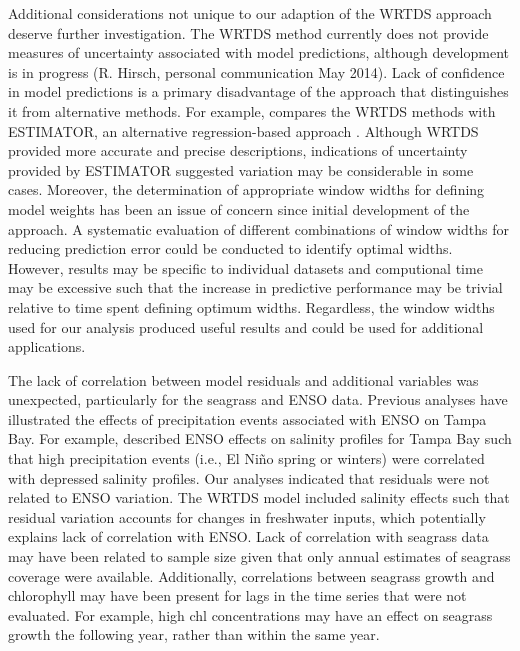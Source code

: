 \documentclass[letterpaper,12pt,oneside]{article}\usepackage[]{graphicx}\usepackage[]{color}
\begin{document}
Additional considerations not unique to our adaption of the \ac{WRTDS} approach deserve further investigation.  The \ac{WRTDS} method currently does not provide measures of uncertainty associated with model predictions, although development is in progress (R. Hirsch, personal communication May 2014). Lack of confidence in model predictions is a primary disadvantage of the approach that distinguishes it from alternative methods.  For example, \citet{Moyer12} compares the \ac{WRTDS} methods with ESTIMATOR, an alternative regression-based approach \citep{Cohn92}.  Although \ac{WRTDS} provided more accurate and precise descriptions, indications of uncertainty provided by ESTIMATOR suggested variation may be considerable in some cases.  Moreover, the determination of appropriate window widths for defining model weights has been an issue of concern since initial development of the approach.  A systematic evaluation of different combinations of window widths for reducing prediction error could be conducted to identify optimal widths.  However, results may be specific to individual datasets and computional time may be excessive such that the increase in predictive performance may be trivial relative to time spent defining optimum widths.  Regardless, the window widths used for our analysis produced useful results and could be used for additional applications.

The lack of correlation between model residuals and additional variables was unexpected, particularly for the seagrass and \ac{ENSO} data.  Previous analyses have illustrated the effects of precipitation events associated with \ac{ENSO} on Tampa Bay.  For example, \citet{Schmidt02} described \ac{ENSO} effects on salinity profiles for Tampa Bay such that high precipitation events (i.e., El Ni\~{n}o spring or winters) were correlated with depressed salinity profiles.  Our analyses indicated that residuals were not related to \ac{ENSO} variation.  The \ac{WRTDS} model included salinity effects such that residual variation accounts for changes in freshwater inputs, which potentially explains lack of correlation with \ac{ENSO}. Lack of correlation with seagrass data may have been related to sample size given that only annual estimates of seagrass coverage were available.  Additionally, correlations between seagrass growth and chlorophyll may have been present for lags in the time series that were not evaluated.  For example, high \ac{chl} concentrations may have an effect on seagrass growth the following year, rather than within the same year.
\end{document}
